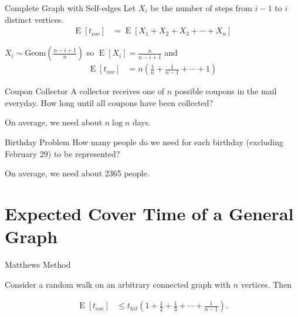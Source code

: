 \documentclass[12pt]{beamer}
\DeclareMathOperator{\E}{\textrm{E}}		     %
\begin{document}
\begin{frame}{Complete Graph with Self-edges}
Let $X_i$ be the number of steps from $i-1$ to $i$ distinct vertices.
 {
\begin{align}
\E[t_{cov}] &= \E[X_1+X_2+X_3+\cdots+X_{n}] \nonumber
\end{align}
}

 {$X_i \sim \textrm{Geom}(\frac{n-i+1}{n})$}
 {so $\E[X_i] = \frac{n}{n-i+1}$}
 {and
\begin{align}
\E[t_{cov}] &= n\left(\frac{1}{n}+\frac{1}{n-1}+\cdots+1\right) \nonumber
\end{align}
}
\end{frame}

\begin{frame}{Coupon Collector}
\centering
A collector receives one of $n$ possible coupons in the mail everyday.
How long until all coupons have been collected?
\bigskip

On average, we need about $n \log n$ days.
\end{frame}

\begin{frame}{Birthday Problem}
\centering
How many people do we need for each birthday (excluding February 29)
to be represented?
\bigskip

On average, we need about 2365 people.
\end{frame}

\section{Expected Cover Time of a General Graph}

\begin{frame}{Matthews Method}
\begin{theorem}
Consider a random walk on an arbitrary connected graph with $n$ vertices. Then
\end{theorem}
\begin{align}
\E[t_{cov}] &\leq t_{hit} \left(1 + \frac{1}{2} + \frac{1}{3} + \cdots + \frac{1}{n-1} \right). \nonumber
\end{align}
\end{frame}
\end{document}
